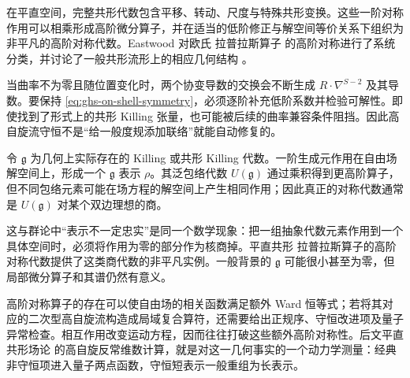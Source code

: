 在平直空间，完整共形代数包含平移、转动、尺度与特殊共形变换。这些一阶对称作用可以相乘形成高阶微分算子，并在适当的低阶修正与解空间等价关系下组织为非平凡的高阶对称代数。Eastwood 对欧氏 拉普拉斯算子 的高阶对称进行了系统分类，并讨论了一般共形流形上的相应几何结构 \cite{eastwood-higher}。

当曲率不为零且随位置变化时，两个协变导数的交换会不断生成 $R\cdot\nabla^{S-2}$ 及其导数。要保持 \cref{eq:ghs-on-shell-symmetry}，必须逐阶补充低阶系数并检验可解性。即使找到了形式上的共形 Killing 张量，也可能被后续的曲率兼容条件阻挡。因此高自旋流守恒不是“给一般度规添加联络”就能自动修复的。

令 $\mathfrak g$ 为几何上实际存在的 Killing 或共形 Killing 代数。一阶生成元作用在自由场解空间上，形成一个 $\mathfrak g$ 表示 $\rho$。其泛包络代数 $U(\mathfrak g)$ 通过乘积得到更高阶算子，但不同包络元素可能在场方程的解空间上产生相同作用；因此真正的对称代数通常是 $U(\mathfrak g)$ 对某个双边理想的商。

这与群论中“表示不一定忠实”是同一个数学现象：把一组抽象代数元素作用到一个具体空间时，必须将作用为零的部分作为核商掉。平直共形 拉普拉斯算子的高阶对称代数提供了这类商代数的非平凡实例。一般背景的 $\mathfrak g$ 可能很小甚至为零，但局部微分算子和其谱仍然有意义。

高阶对称算子的存在可以使自由场的相关函数满足额外 Ward 恒等式；若将其对应的二次型高自旋流构造成局域复合算符，还需要给出正规序、守恒改进项及量子异常检查。相互作用改变运动方程，因而往往打破这些额外高阶对称性。后文平直 共形场论 的高自旋反常维数计算，就是对这一几何事实的一个动力学测量：经典非守恒项进入量子两点函数，守恒短表示一般重组为长表示。
